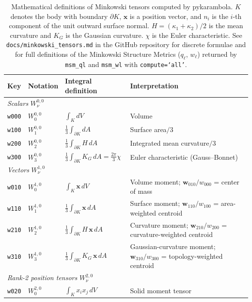 \documentclass[unnumsec,webpdf,contemporary,large,namedate]{oup-authoring-template}
\begin{document}
\begin{table}[!ht]
\centering
\caption{%
  Mathematical definitions of Minkowski tensors computed by pykarambola.
  $K$ denotes the body with boundary $\partial K$, $\mathbf{x}$ is a position vector, and $n_i$ is the $i$-th component of the unit outward surface normal.
  $H=(\kappa_1{+}\kappa_2)/2$ is the mean curvature and $K_G$ is the Gaussian curvature.
  $\chi$ is the Euler characteristic.
  See \texttt{docs/minkowski\_tensors.md} in the GitHub repository for discrete formulae and for full definitions of the Minkowski Structure Metrics ($q_\ell$, $w_\ell$) returned by \texttt{msm\_ql} and \texttt{msm\_wl} with \texttt{compute=`all'}.
}
\label{tab:tensors}
\small
\renewcommand{\arraystretch}{1.7}
\begin{tabular}{llll}
\hline
\textbf{Key} & \textbf{Notation} & \textbf{Integral definition} & \textbf{Interpretation} \\
\hline
\multicolumn{4}{l}{\textit{Scalars} $W_\nu^{0,0}$} \\
\texttt{w000} & $W_0^{0,0}$ & $\int_K dV$ & Volume \\
\texttt{w100} & $W_1^{0,0}$ & $\tfrac{1}{3}\int_{\partial K} dA$ & Surface area$/3$ \\
\texttt{w200} & $W_2^{0,0}$ & $\tfrac{1}{3}\int_{\partial K} H\,dA$ & Integrated mean curvature$/3$ \\
\texttt{w300} & $W_3^{0,0}$ & $\tfrac{1}{3}\int_{\partial K} K_G\,dA = \tfrac{2\pi}{3}\chi$ & Euler characteristic (Gauss--Bonnet) \\
\hline
\multicolumn{4}{l}{\textit{Vectors} $W_\nu^{1,0}$} \\
\texttt{w010} & $W_0^{1,0}$ & $\int_K \mathbf{x}\,dV$ & Volume moment; $\mathbf{w}_{010}/w_{000}$ = center of mass \\
\texttt{w110} & $W_1^{1,0}$ & $\tfrac{1}{3}\int_{\partial K} \mathbf{x}\,dA$ & Surface moment; $\mathbf{w}_{110}/w_{100}$ = area-weighted centroid \\
\texttt{w210} & $W_2^{1,0}$ & $\tfrac{1}{3}\int_{\partial K} H\,\mathbf{x}\,dA$ & Curvature moment; $\mathbf{w}_{210}/w_{200}$ = curvature-weighted centroid \\
\texttt{w310} & $W_3^{1,0}$ & $\tfrac{1}{3}\int_{\partial K} K_G\,\mathbf{x}\,dA$ & Gaussian-curvature moment; $\mathbf{w}_{310}/w_{300}$ = topology-weighted centroid \\
\hline
\multicolumn{4}{l}{\textit{Rank-2 position tensors} $W_\nu^{2,0}$} \\
\texttt{w020} & $W_0^{2,0}$ & $\int_K x_i x_j\,dV$ & Solid moment tensor \\

\end{tabular}
\end{table}
\end{document}
